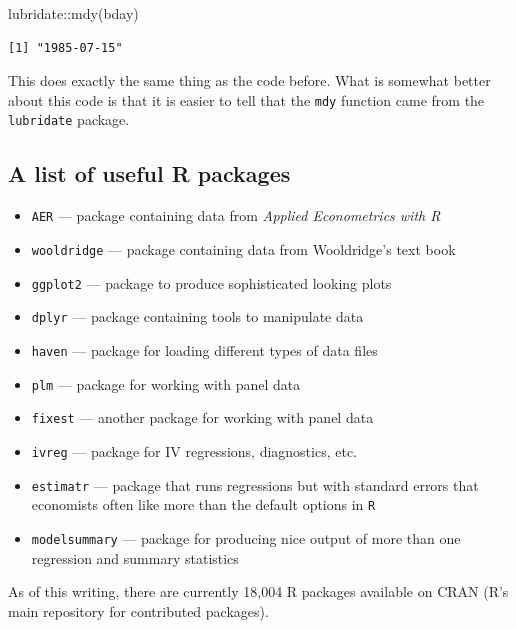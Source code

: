 \documentclass[
  letterpaper,
  DIV=11,
  numbers=noendperiod]{scrreprt}
\newenvironment{Shaded}{\begin{snugshade}}{\end{snugshade}}
\newcommand{\FunctionTok}[1]{\textcolor[rgb]{0.28,0.35,0.67}{#1}}
\newcommand{\NormalTok}[1]{\textcolor[rgb]{0.00,0.23,0.31}{#1}}
\newcommand{\SpecialCharTok}[1]{\textcolor[rgb]{0.37,0.37,0.37}{#1}}
\begin{document}
\begin{Shaded}
\begin{Highlighting}[]
\NormalTok{lubridate}\SpecialCharTok{::}\FunctionTok{mdy}\NormalTok{(bday)}
\end{Highlighting}
\end{Shaded}

\begin{verbatim}
[1] "1985-07-15"
\end{verbatim}

This does exactly the same thing as the code before. What is somewhat
better about this code is that it is easier to tell that the
\texttt{mdy} function came from the \texttt{lubridate} package.

\subsection{A list of useful R
packages}\label{a-list-of-useful-r-packages}

\begin{itemize}
\item
  \texttt{AER} --- package containing data from \emph{Applied
  Econometrics with R}
\item
  \texttt{wooldridge} --- package containing data from Wooldridge's text
  book
\item
  \texttt{ggplot2} --- package to produce sophisticated looking plots
\item
  \texttt{dplyr} --- package containing tools to manipulate data
\item
  \texttt{haven} --- package for loading different types of data files
\item
  \texttt{plm} --- package for working with panel data
\item
  \texttt{fixest} --- another package for working with panel data
\item
  \texttt{ivreg} --- package for IV regressions, diagnostics, etc.
\item
  \texttt{estimatr} --- package that runs regressions but with standard
  errors that economists often like more than the default options in
  \texttt{R}
\item
  \texttt{modelsummary} --- package for producing nice output of more
  than one regression and summary statistics
\end{itemize}

As of this writing, there are currently 18,004 R packages available on
CRAN (R's main repository for contributed packages).
\end{document}

